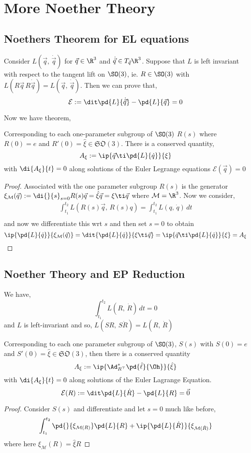 
\section{More Noether Theory}

\subsection{Noethers Theorem for EL equations}

Consider $L(\vec q,\, \dot{\vec q})$ for $\vec q \in \R^3$ and $\dot{\vec q} \in T_{\vec q}\R^3$. Suppose that $L$ is left invariant with respect to the tangent lift on $\SO(3)$, ie. $R\in\SO(3)$ with $L(R\vec q\, R\dot{\vec q}) = L(\vec q,\,\dot{\vec q})$. Then we can prove that,
$$ \mathcal{E} := \dit \pd{L}{\dot{\vec q}} - \pd{L}{\vec q} = 0 $$

Now we have theorem,
\begin{nthm}
  Corresponding to each one-parameter subgroup of $\SO(3)$ $R(s)$ where $R(0) = e$ and $R'(0) = \hat\xi \in \mathfrak{SO}(3)$. There is a conserved quantity,
  $$ A_\xi := \ip{\vec q \ti \pd{L}{\dot q}}{\xi} $$
  with $\di{A_\xi}{t} = 0$ along solutions of the Euler Legrange equations $\mathcal{E}(\vec q) = 0$
\end{nthm}
\begin{proof}
  Associated with the one parameter subgroup $R(s)$ is the generator $\xi_{\mathcal{M}}(\vec q) := \di{}{s}_{s=0} R(s)\vec q = \hat\xi \vec q = \xi\ti\vec q$ where $\mathcal{M} = \R^3$. Now we consider,
  \begin{align*}
    \int_{t_1}^{t_2} L(R(s)\vec q,\,R(s)q) = \int_{t_1}^{t_2} L(q,\,\dot q) \,dt \\
  \end{align*}
  and now we differentiate this wrt $s$ and then set $s = 0$ to obtain
  $$ \ip{\pd{L}{\dot q}}{\xi_{\mathcal{M}}(\vec q)} = \dit{\pd{L}{\dot q}}{\xi \ti \vec q} = \ip{\vec q \ti \pd{L}{\dot q}}{\xi} = A_\xi$$
\end{proof}

\subsection{Noether Theory and EP Reduction}
We have,
$$ \int_{t_1}^{t_2} L(R,\,\dot R)\,dt = 0 $$
and $L$ is left-invariant and so, $L(SR,\,S\dot R) = L(R,\,\dot R)$
\begin{nthm}
  Corresponding to each one parameter subgroup of $\SO(3)$, $S(s)$ with $S(0)= e$ and $S'(0) = \hat\xi \in \mathfrak{SO}(3)$, then there is a conserved quantity
  $$ A_\xi := \ip{\Ad^*_{R^\top}\pd{\hat\ell}{\Oh}}{\hat\xi} $$
  with $\di{A_\xi}{t} = 0$ along solutions of the Euler Lagrange Equation.
  $$ \mathcal{E}(R) := \dit\pd{L}{\dot R} - \pd{L}{R} = \vec 0 $$
\end{nthm}
\begin{proof}
  Consider $S(s)$ and differentiate and let $s = 0$ much like before,
  $$ \int_{t_1}^{t_2} \pd{}{\xi_{\mathcal{M}(R)}}\pd{L}{R} + \ip{\pd{L}{\dot R}}{\xi_{\mathcal{M}(\dot R)}} $$
  where here $\xi_{\mathcal{M}}(R) = \hat\xi R$
\end{proof}


